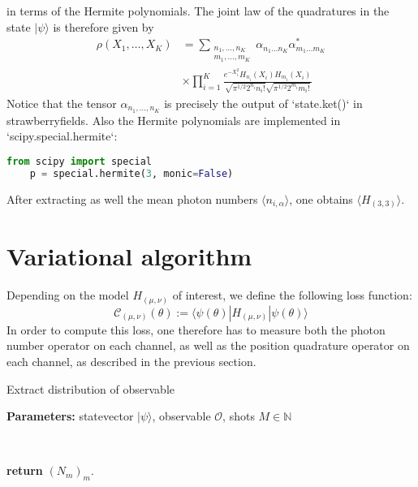 \documentclass[reprint, amsmath, amssymb, aps]{revtex4-2}
\begin{document}
    in terms of the Hermite polynomials. The joint law of the quadratures in the state $|\psi\rangle$ is therefore given by
    \begin{equation}
    \begin{split}
        \rho(X_1,\dots,X_{K}) &= \sum_{\substack{n_1,\dots,n_{K} \\ m_1,\dots,m_{K}}} \alpha_{n_1\dots n_{K}}\alpha^*_{m_1\dots m_{K}}\\
        &\times\prod_{i=1}^{K}\frac{e^{-X_i^2}H_{n_i}(X_i)H_{m_i}(X_i)}{\sqrt{\pi^{1/2}2^{n_i}n_i!}\sqrt{\pi^{1/2}2^{m_i}m_i!}}
    \end{split}
    \end{equation}
    Notice that the tensor $\alpha_{n_1,\dots,n_{K}}$ is precisely the output of `state.ket()` in strawberryfields.
    Also the Hermite polynomials are implemented in `scipy.special.hermite`:
    \begin{lstlisting}[language=Python]
    from scipy import special
    p = special.hermite(3, monic=False)
    \end{lstlisting}

    After extracting as well the mean photon numbers $\langle n_{i,\alpha}\rangle$, one obtains $\langle H_{(3,3)}\rangle$.

\section{Variational algorithm}

    Depending on the model $H_{(\mu,\nu)}$ of interest, we define the following loss function:
    \begin{equation}
        \mathcal C_{(\mu,\nu)}(\theta) := \langle\psi(\theta)|H_{(\mu,\nu)}|\psi(\theta)\rangle
    \end{equation}
    In order to compute this loss, one therefore has to measure both the photon number operator on each channel, as well as the position quadrature operator on each channel, as described in the previous section.
    \newpage

    \begin{algorithm}
        \caption{Extract distribution of observable}\label{alg:statistics_computation}
            \textbf{Parameters:} statevector $|\psi\rangle$, observable $\mathcal O$, shots $M\in\mathbb N$

            \

            \textbf{return} $(N_m)_m$.
    \end{algorithm}
\end{document}
